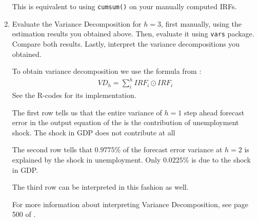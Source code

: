 \begin{enumerate}
\begin{sol}
              This is equivalent to using \verb|cumsum()| on your manually computed IRFs.
          \end{sol}

    \item Evaluate the Variance Decomposition for $h=3$, first manually, using the estimation results you obtained above. Then, evaluate it using \verb|vars| package. Compare both results. Lastly, interpret the variance decompositions you obtained.

          \begin{sol}
              To obtain variance decomposition we use the formula from \cite[][see page 499]{MartinHurnHarris-2012}:
              \begin{align*}
                  VD_h = \sum_i^h IRF_i \odot IRF_i
              \end{align*}
              See the R-codes for its implementation.

              The first row tells us that the entire variance of $h = 1$ step ahead forecast error in the output equation of the \varp{} is the contribution of unemployment shock. The shock in GDP does not contribute at all

              The second row tells that $0.9775\%$ of the forecast error variance at $h = 2$ is explained by the shock in unemployment. Only $0.0225\%$ is due to the shock in GDP.

              The third row can be interpreted in this fashion as well.

              For more information about interpreting Variance Decomposition, see page 500 of \cite{MartinHurnHarris-2012}.
          \end{sol}
\end{enumerate}